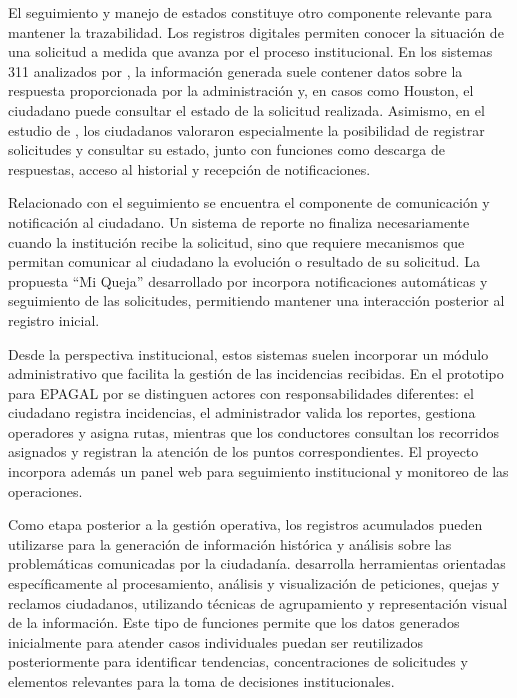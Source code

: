 El seguimiento y manejo de estados constituye otro componente relevante para mantener la trazabilidad. Los registros digitales permiten conocer la situación de una solicitud a medida que avanza por el proceso institucional. En los sistemas 311 analizados por \cite{cook2024potholes}, la información generada suele contener datos sobre la respuesta proporcionada por la administración y, en casos como Houston, el ciudadano puede consultar el estado de la solicitud realizada. Asimismo, en el estudio de \cite{moreno2026diseno}, los ciudadanos valoraron especialmente la posibilidad de registrar solicitudes y consultar su estado, junto con funciones como descarga de respuestas, acceso al historial y recepción de notificaciones.

Relacionado con el seguimiento se encuentra el componente de comunicación y notificación al ciudadano. Un sistema de reporte no finaliza necesariamente cuando la institución recibe la solicitud, sino que requiere mecanismos que permitan comunicar al ciudadano la evolución o resultado de su solicitud. La propuesta “Mi Queja” desarrollado por \cite{murillo2025aplicacion} incorpora notificaciones automáticas y seguimiento de las solicitudes, permitiendo mantener una interacción posterior al registro inicial.

Desde la perspectiva institucional, estos sistemas suelen incorporar un módulo administrativo que facilita la gestión de las incidencias recibidas. En el prototipo para EPAGAL por \cite{rodriguezdesarrollo} se distinguen actores con responsabilidades diferentes: el ciudadano registra incidencias, el administrador valida los reportes, gestiona operadores y asigna rutas, mientras que los conductores consultan los recorridos asignados y registran la atención de los puntos correspondientes. El proyecto incorpora además un panel web para seguimiento institucional y monitoreo de las operaciones.

Como etapa posterior a la gestión operativa, los registros acumulados pueden utilizarse para la generación de información histórica y análisis sobre las problemáticas comunicadas por la ciudadanía. \cite{hubert2021herramientas} desarrolla herramientas orientadas específicamente al procesamiento, análisis y visualización de peticiones, quejas y reclamos ciudadanos, utilizando técnicas de agrupamiento y representación visual de la información. Este tipo de funciones permite que los datos generados inicialmente para atender casos individuales puedan ser reutilizados posteriormente para identificar tendencias, concentraciones de solicitudes y elementos relevantes para la toma de decisiones institucionales.

